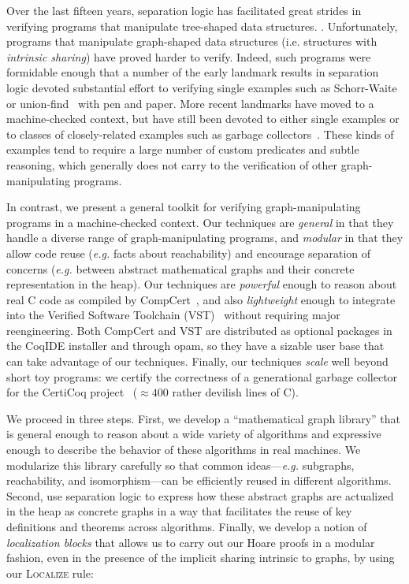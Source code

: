 Over the last fifteen years, separation logic has facilitated great strides
in verifying programs that manipulate tree-shaped data structures.
\citep{berdine:smallfoot,chin:hipsleek,jacobs:verifast,
chlipala:bedrock,bengtson:charge,appel:programlogics}.
Unfortunately, programs that manipulate graph-shaped data structures
(i.e. structures with \emph{intrinsic sharing}) have proved harder to verify.
Indeed, such programs were formidable enough that a number of the early
landmark results in separation logic devoted substantial effort to verifying
single examples such as Schorr-Waite~\cite{hongseok:phd} or
union-find~\cite{neelthesis} with pen and paper.
More recent landmarks have moved to a machine-checked context, but have still
been devoted to either single examples or to classes of closely-related examples
such as garbage collectors~\cite{gcexample3,cakemlgc}.
These kinds of examples tend to require a large number
of custom predicates and subtle reasoning, which generally does not carry
to the verification of other graph-manipulating programs.

In contrast, we present a general toolkit for verifying graph-manipulating programs in a
machine-checked context. Our techniques are \emph{general} in that they handle a diverse
range of graph-manipulating programs, and \emph{modular} in that they allow code
reuse (\emph{e.g.} facts about reachability) and encourage separation of concerns
(\emph{e.g.} between abstract mathematical graphs and their concrete representation
in the heap).
Our techniques are \emph{powerful} enough to reason about real C code as compiled by
CompCert~\cite{leroy:compcert}, and also
\emph{lightweight} enough to integrate into the Verified
Software Toolchain (VST)~\cite{appel:programlogics} without requiring major reengineering.
Both CompCert and VST are distributed as optional packages in the CoqIDE installer and through 
opam, so they have a sizable user base that can take advantage of our techniques. %
Finally, our techniques \emph{scale} well beyond short toy programs: we certify the
correctness of a generational garbage collector for the CertiCoq
project~\cite{certicoqpaper} ($\approx400$ rather devilish lines of C).

We proceed in three steps. First, we develop a ``mathematical graph library'' that is general enough to reason about a wide variety of algorithms and expressive enough to describe the behavior of these algorithms in real machines.  We modularize this library carefully so that common ideas---\emph{e.g.} subgraphs, reachability, and isomorphism---can be efficiently reused
in different algorithms.  Second, use separation logic to express how these abstract graphs
are actualized in the heap as concrete graphs in a way that facilitates the reuse of key definitions and theorems across algorithms.  Finally, we develop a notion of \emph{localization blocks} that
allows us to carry out our Hoare proofs in a modular fashion, even in the presence of the
implicit sharing intrinsic to graphs, by using our \textsc{Localize} rule:

